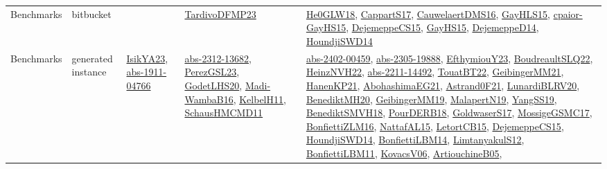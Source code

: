 {\begin{longtable}{lp{3cm}>{\raggedright}p{6cm}>{\raggedright}p{6cm}p{8cm}}
Benchmarks & bitbucket &  & \href{papers/TardivoDFMP23.pdf}{TardivoDFMP23}\cite{TardivoDFMP23} & \href{papers/He0GLW18.pdf}{He0GLW18}\cite{He0GLW18}, \href{papers/CappartS17.pdf}{CappartS17}\cite{CappartS17}, \href{papers/CauwelaertDMS16.pdf}{CauwelaertDMS16}\cite{CauwelaertDMS16}, \href{papers/GayHLS15.pdf}{GayHLS15}\cite{GayHLS15}, \href{papers/cpaior-GayHS15.pdf}{cpaior-GayHS15}\cite{cpaior-GayHS15}, \href{papers/DejemeppeCS15.pdf}{DejemeppeCS15}\cite{DejemeppeCS15}, \href{papers/GayHS15.pdf}{GayHS15}\cite{GayHS15}, \href{papers/DejemeppeD14.pdf}{DejemeppeD14}\cite{DejemeppeD14}, \href{papers/HoundjiSWD14.pdf}{HoundjiSWD14}\cite{HoundjiSWD14}\\
Benchmarks & generated instance & \href{articles/IsikYA23.pdf}{IsikYA23}\cite{IsikYA23}, \href{articles/abs-1911-04766.pdf}{abs-1911-04766}\cite{abs-1911-04766} & \href{articles/abs-2312-13682.pdf}{abs-2312-13682}\cite{abs-2312-13682}, \href{papers/PerezGSL23.pdf}{PerezGSL23}\cite{PerezGSL23}, \href{papers/GodetLHS20.pdf}{GodetLHS20}\cite{GodetLHS20}, \href{papers/Madi-WambaB16.pdf}{Madi-WambaB16}\cite{Madi-WambaB16}, \href{articles/KelbelH11.pdf}{KelbelH11}\cite{KelbelH11}, \href{articles/SchausHMCMD11.pdf}{SchausHMCMD11}\cite{SchausHMCMD11} & \href{articles/abs-2402-00459.pdf}{abs-2402-00459}\cite{abs-2402-00459}, \href{articles/abs-2305-19888.pdf}{abs-2305-19888}\cite{abs-2305-19888}, \href{papers/EfthymiouY23.pdf}{EfthymiouY23}\cite{EfthymiouY23}, \href{papers/BoudreaultSLQ22.pdf}{BoudreaultSLQ22}\cite{BoudreaultSLQ22}, \href{articles/HeinzNVH22.pdf}{HeinzNVH22}\cite{HeinzNVH22}, \href{articles/abs-2211-14492.pdf}{abs-2211-14492}\cite{abs-2211-14492}, \href{papers/TouatBT22.pdf}{TouatBT22}\cite{TouatBT22}, \href{papers/GeibingerMM21.pdf}{GeibingerMM21}\cite{GeibingerMM21}, \href{papers/HanenKP21.pdf}{HanenKP21}\cite{HanenKP21}, \href{articles/AbohashimaEG21.pdf}{AbohashimaEG21}\cite{AbohashimaEG21}, \href{papers/Astrand0F21.pdf}{Astrand0F21}\cite{Astrand0F21}, \href{articles/LunardiBLRV20.pdf}{LunardiBLRV20}\cite{LunardiBLRV20}, \href{articles/BenediktMH20.pdf}{BenediktMH20}\cite{BenediktMH20}, \href{papers/GeibingerMM19.pdf}{GeibingerMM19}\cite{GeibingerMM19}, \href{papers/MalapertN19.pdf}{MalapertN19}\cite{MalapertN19}, \href{papers/YangSS19.pdf}{YangSS19}\cite{YangSS19}, \href{papers/BenediktSMVH18.pdf}{BenediktSMVH18}\cite{BenediktSMVH18}, \href{articles/PourDERB18.pdf}{PourDERB18}\cite{PourDERB18}, \href{papers/GoldwaserS17.pdf}{GoldwaserS17}\cite{GoldwaserS17}, \href{papers/MossigeGSMC17.pdf}{MossigeGSMC17}\cite{MossigeGSMC17}, \href{papers/BonfiettiZLM16.pdf}{BonfiettiZLM16}\cite{BonfiettiZLM16}, \href{articles/NattafAL15.pdf}{NattafAL15}\cite{NattafAL15}, \href{articles/LetortCB15.pdf}{LetortCB15}\cite{LetortCB15}, \href{papers/DejemeppeCS15.pdf}{DejemeppeCS15}\cite{DejemeppeCS15}, \href{papers/HoundjiSWD14.pdf}{HoundjiSWD14}\cite{HoundjiSWD14}, \href{articles/BonfiettiLBM14.pdf}{BonfiettiLBM14}\cite{BonfiettiLBM14}, \href{articles/LimtanyakulS12.pdf}{LimtanyakulS12}\cite{LimtanyakulS12}, \href{papers/BonfiettiLBM11.pdf}{BonfiettiLBM11}\cite{BonfiettiLBM11}, \href{papers/KovacsV06.pdf}{KovacsV06}\cite{KovacsV06}, \href{papers/ArtiouchineB05.pdf}{ArtiouchineB05}\cite{ArtiouchineB05}, 
\end{longtable}}
